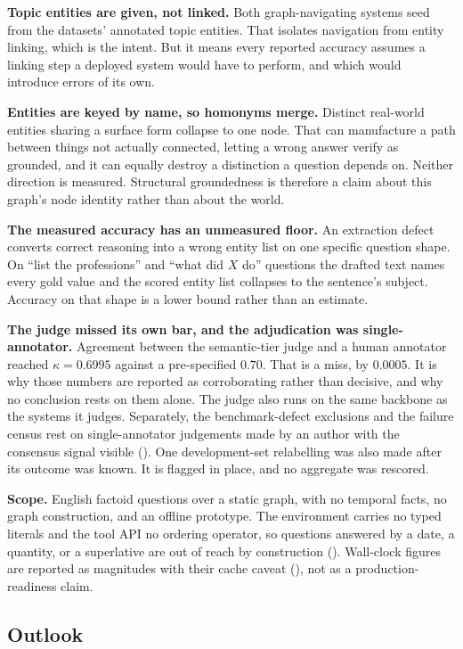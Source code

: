 \textbf{Topic entities are given, not linked.} Both graph-navigating
systems seed from the datasets' annotated topic entities. That isolates
navigation from entity linking, which is the intent. But it means every
reported accuracy assumes a linking step a deployed system would have to
perform, and which would introduce errors of its own.

\textbf{Entities are keyed by name, so homonyms merge.} Distinct
real-world entities sharing a surface form collapse to one node. That
can manufacture a path between things not actually connected, letting a
wrong answer verify as grounded, and it can equally destroy a
distinction a question depends on. Neither direction is measured.
Structural groundedness is therefore a claim about this graph's node
identity rather than about the world.

\textbf{The measured accuracy has an unmeasured floor.} An extraction
defect converts correct reasoning into a wrong entity list on one
specific question shape. On ``list the professions'' and ``what did $X$
do'' questions the drafted text names every gold value and the scored
entity list collapses to the sentence's subject. Accuracy on that shape
is a lower bound rather than an estimate.

\textbf{The judge missed its own bar, and the adjudication was
single-annotator.} Agreement between the semantic-tier judge and a human
annotator reached $\kappa = 0.6995$ against a pre-specified $0.70$. That
is a miss, by $0.0005$. It is why those numbers are reported as
corroborating rather than decisive, and why no conclusion rests on them
alone. The judge also runs on the same backbone as the systems it
judges. Separately, the benchmark-defect exclusions and the failure
census rest on single-annotator judgements made by an author with the
consensus signal visible (). One development-set
relabelling was also made after its outcome was known. It is flagged in
place, and no aggregate was rescored.

\textbf{Scope.} English factoid questions over a static graph, with no
temporal facts, no graph construction, and an offline prototype. The
environment carries no typed literals and the tool API no ordering
operator, so questions answered by a date, a quantity, or a superlative
are out of reach by construction (). Wall-clock
figures are reported as magnitudes with their cache caveat
(), not as a production-readiness claim.

\subsection{Outlook}\label{sec:outlook}


